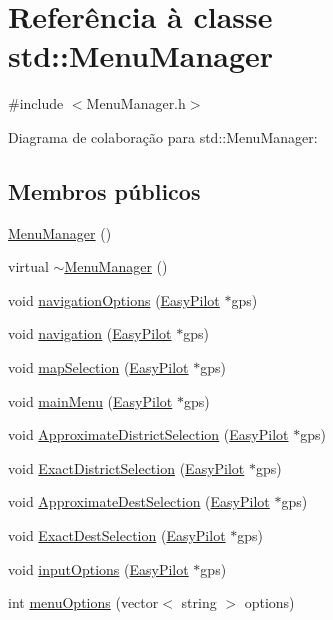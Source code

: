 \hypertarget{classstd_1_1_menu_manager}{}\section{Referência à classe std\+:\+:Menu\+Manager}
\label{classstd_1_1_menu_manager}


{\ttfamily \#include $<$Menu\+Manager.\+h$>$}



Diagrama de colaboração para std\+:\+:Menu\+Manager\+:
\subsection*{Membros públicos}
\begin{DoxyCompactItemize}
\item 
\hyperlink{classstd_1_1_menu_manager_a0e57899dfa981f18aa39890638a0d131}{Menu\+Manager} ()
\item 
virtual \hyperlink{classstd_1_1_menu_manager_a2e39acf092dd4a46e904ca141088bcd1}{$\sim$\+Menu\+Manager} ()
\item 
void \hyperlink{classstd_1_1_menu_manager_a6b49d6cd4fe3260d9642dbb20381f43c}{navigation\+Options} (\hyperlink{class_easy_pilot}{Easy\+Pilot} $\ast$gps)
\item 
void \hyperlink{classstd_1_1_menu_manager_a07bff9624aa3fc9104ec98c79b8c37a1}{navigation} (\hyperlink{class_easy_pilot}{Easy\+Pilot} $\ast$gps)
\item 
void \hyperlink{classstd_1_1_menu_manager_a77cd2018d2592e12d39dd07eb6f21022}{map\+Selection} (\hyperlink{class_easy_pilot}{Easy\+Pilot} $\ast$gps)
\item 
void \hyperlink{classstd_1_1_menu_manager_a638c286f464bf2d495aa2b4fb213302e}{main\+Menu} (\hyperlink{class_easy_pilot}{Easy\+Pilot} $\ast$gps)
\item 
void \hyperlink{classstd_1_1_menu_manager_abed94057ed99af5fc35be97742359585}{Approximate\+District\+Selection} (\hyperlink{class_easy_pilot}{Easy\+Pilot} $\ast$gps)
\item 
void \hyperlink{classstd_1_1_menu_manager_a9d27786670fa4ccfec164863eec87b4a}{Exact\+District\+Selection} (\hyperlink{class_easy_pilot}{Easy\+Pilot} $\ast$gps)
\item 
void \hyperlink{classstd_1_1_menu_manager_aa15f39e5d4c32479e5487be2e1b38d67}{Approximate\+Dest\+Selection} (\hyperlink{class_easy_pilot}{Easy\+Pilot} $\ast$gps)
\item 
void \hyperlink{classstd_1_1_menu_manager_a2ffb71762aba39d2d9e0233e7bc88f92}{Exact\+Dest\+Selection} (\hyperlink{class_easy_pilot}{Easy\+Pilot} $\ast$gps)
\item 
void \hyperlink{classstd_1_1_menu_manager_a430a4b321213835da37750a9bd565865}{input\+Options} (\hyperlink{class_easy_pilot}{Easy\+Pilot} $\ast$gps)
\item 
int \hyperlink{classstd_1_1_menu_manager_a1235a2b53d90aeb5f60c043be9caf62b}{menu\+Options} (vector$<$ string $>$ options)
\end{DoxyCompactItemize}


